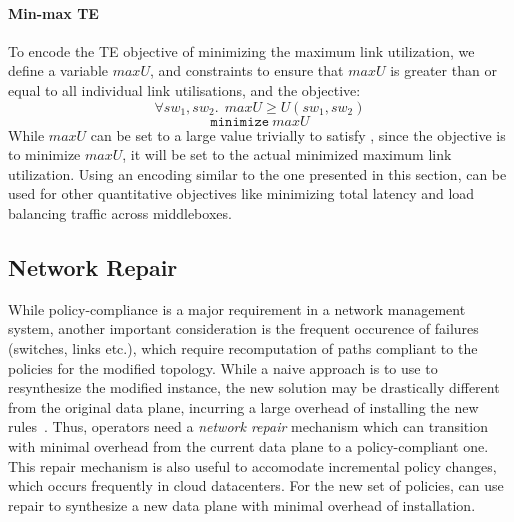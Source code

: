 \paragraph{Min-max TE}
To encode the TE objective of minimizing the maximum link utilization, we define
a variable $maxU$, and constraints to ensure that $maxU$ is greater than or equal to all 
individual link utilisations, and the objective: 
\begin{equation} \label{eq:maxu}
\forall sw_1, sw_2.\ \ maxU \geq U(sw_1, sw_2)
\end{equation} 
\begin{equation}
		\texttt{minimize}\ maxU
\end{equation}
While $maxU$ can be set to a large value trivially to satisfy , 
since the objective is to minimize $maxU$, it will be set to the actual
minimized maximum link utilization. Using an encoding similar to the one presented in this section, \name can be used for other
quantitative objectives like minimizing total latency and load balancing
traffic across middleboxes.

\subsection{Network Repair}
While policy-compliance is a major requirement in a network management system,
another important consideration is the frequent occurence of failures (switches, links etc.),
which require recomputation of paths compliant to the policies for the modified topology. 
While a naive approach is to use \name to resynthesize the modified instance,
the new solution may be drastically different from the original data plane, incurring a
large overhead of installing the new rules~\cite{sdnlatency,updatescheduling}. Thus, operators
need a \emph{network repair} mechanism which can transition with minimal
overhead from the current
data plane to a policy-compliant one. 
This repair mechanism is also useful to accomodate incremental policy
changes, which occurs frequently in cloud datacenters. 
For the new set of policies, \name can use repair to synthesize
a new data plane with minimal overhead of installation.  

